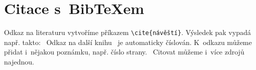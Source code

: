 \documentclass{article}
\begin{document}
\section*{Citace s~Bib\TeX em}
    Odkaz na literaturu vytvoříme příkazem \verb|\cite{návěští}|. Výsledek pak 
    vypadá např. takto:~\cite{inbook-full} Odkaz na další 
    knihu~\cite{article-full} je automaticky číslován. K~odkazu můžeme přidat 
    i~nějakou poznámku, např.  číslo strany.~\cite[strana 26]{chicago-manual} 
    Citovat můžeme i~více zdrojů najednou.~\cite{inbook-full, article-full}

\printbibliography[heading=bibintoc] %
\end{document}
